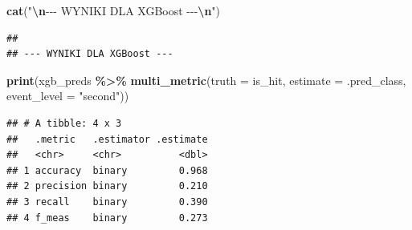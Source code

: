 \documentclass[
]{article}
\newenvironment{Shaded}{\begin{snugshade}}{\end{snugshade}}
\newcommand{\AttributeTok}[1]{\textcolor[rgb]{0.13,0.29,0.53}{#1}}
\newcommand{\FunctionTok}[1]{\textcolor[rgb]{0.13,0.29,0.53}{\textbf{#1}}}
\newcommand{\NormalTok}[1]{#1}
\newcommand{\SpecialCharTok}[1]{\textcolor[rgb]{0.81,0.36,0.00}{\textbf{#1}}}
\newcommand{\StringTok}[1]{\textcolor[rgb]{0.31,0.60,0.02}{#1}}
\begin{document}
\begin{Shaded}
\begin{Highlighting}[]
\FunctionTok{cat}\NormalTok{(}\StringTok{"}\SpecialCharTok{\textbackslash{}n}\StringTok{{-}{-}{-} WYNIKI DLA XGBoost {-}{-}{-}}\SpecialCharTok{\textbackslash{}n}\StringTok{"}\NormalTok{)}
\end{Highlighting}
\end{Shaded}

\begin{verbatim}
## 
## --- WYNIKI DLA XGBoost ---
\end{verbatim}

\begin{Shaded}
\begin{Highlighting}[]
\FunctionTok{print}\NormalTok{(xgb\_preds }\SpecialCharTok{\%\textgreater{}\%} \FunctionTok{multi\_metric}\NormalTok{(}\AttributeTok{truth =}\NormalTok{ is\_hit, }\AttributeTok{estimate =}\NormalTok{ .pred\_class, }\AttributeTok{event\_level =} \StringTok{"second"}\NormalTok{))}
\end{Highlighting}
\end{Shaded}

\begin{verbatim}
## # A tibble: 4 x 3
##   .metric   .estimator .estimate
##   <chr>     <chr>          <dbl>
## 1 accuracy  binary         0.968
## 2 precision binary         0.210
## 3 recall    binary         0.390
## 4 f_meas    binary         0.273
\end{verbatim}
\end{document}
